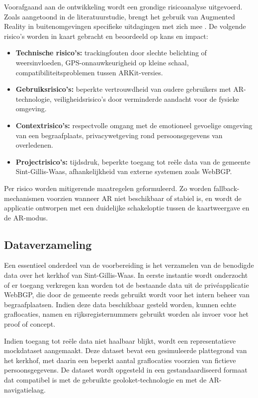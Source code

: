 Voorafgaand aan de ontwikkeling wordt een grondige risicoanalyse uitgevoerd. Zoals aangetoond in de literatuurstudie, brengt het gebruik van Augmented Reality in buitenomgevingen specifieke uitdagingen met zich mee \autocite{Zhao2025}. De volgende risico's worden in kaart gebracht en beoordeeld op kans en impact:

\begin{itemize}
    \item \textbf{Technische risico's:} trackingfouten door slechte belichting of weersinvloeden, GPS-onnauwkeurigheid op kleine schaal, compatibiliteitsproblemen tussen ARKit-versies.
    \item \textbf{Gebruiksrisico's:} beperkte vertrouwdheid van oudere gebruikers met AR-technologie, veiligheidsrisico's door verminderde aandacht voor de fysieke omgeving.
    \item \textbf{Contextrisico's:} respectvolle omgang met de emotioneel gevoelige omgeving van een begraafplaats, privacywetgeving rond persoonsgegevens van overledenen.
    \item \textbf{Projectrisico's:} tijdsdruk, beperkte toegang tot reële data van de gemeente Sint-Gillis-Waas, afhankelijkheid van externe systemen zoals WebBGP.
\end{itemize}

Per risico worden mitigerende maatregelen geformuleerd. Zo worden fallback-mechanismen voorzien wanneer AR niet beschikbaar of stabiel is, en wordt de applicatie ontworpen met een duidelijke schakeloptie tussen de kaartweergave en de AR-modus.

\subsection{Dataverzameling}

Een essentieel onderdeel van de voorbereiding is het verzamelen van de benodigde data over het kerkhof van Sint-Gillis-Waas. In eerste instantie wordt onderzocht of er toegang verkregen kan worden tot de bestaande data uit de privéapplicatie WebBGP, die door de gemeente reeds gebruikt wordt voor het intern beheer van begraafplaatsen. Indien deze data beschikbaar gesteld worden, kunnen echte graflocaties, namen en rijksregisternummers gebruikt worden als invoer voor het proof of concept.

Indien toegang tot reële data niet haalbaar blijkt, wordt een representatieve mockdataset aangemaakt. Deze dataset bevat een gesimuleerde plattegrond van het kerkhof, met daarin een beperkt aantal graflocaties voorzien van fictieve persoonsgegevens. De dataset wordt opgesteld in een gestandaardiseerd formaat dat compatibel is met de gebruikte geoloket-technologie en met de AR-navigatielaag.

